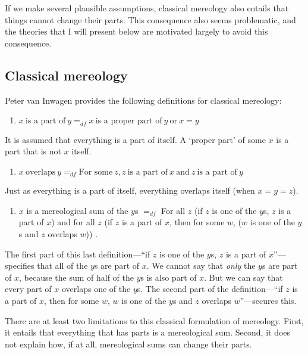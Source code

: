 \documentclass[11pt]{article}
\begin{document}
\begin{spacing}{1.5}
If we make several plausible assumptions, classical mereology also
entails that things cannot change their parts.  This consequence also
seems problematic, and the theories that I will present below are
motivated largely to avoid this consequence.

\subsection{Classical mereology}
\label{tech}
Peter van Inwagen provides the following definitions for classical
mereology:

\begin{enumerate}
  \item $x\ \text{is a part of}\ y =_{df} x\ \text{is a proper part
    of}\ y\ \text{or}\ x = y$
\end{enumerate}

It is assumed that everything is a part of itself.  A `proper part' of
some $x$ is a part that is not $x$ itself.

\begin{enumerate}[start=2]
  \item $x\ \text{overlaps}\ y =_{df} \text{For some}\ z, z\ \text{is
    a part of}\ x\ \text{and}\ z\ \text{is a part of}\ y$
\end{enumerate}

Just as everything is a part of itself, everything overlaps itself
(when $x = y = z$).

\begin{enumerate}[start=3]
  \item $x$ is a mereological sum of the $y$s $=_{df}$ For all $z$ (if
    $z$ is one of the $y$s, $z$ is a part of $x$) and for all $z$ (if
    $z$ is a part of $x$, then for some $w$, ($w$ is one of the $y$s
    and $z$ overlaps $w$)) \citeyearpar[618--619]{inwagen2006}.
\end{enumerate}

The first part of this last definition---``if $z$ is one of the $y$s,
$z$ is a part of $x$''---specifies that all of the $y$s are part of
$x$.  We cannot say that {\em only} the $y$s are part of $x$, because
the sum of half of the $y$s is also part of $x$.  But we can say that
every part of $x$ overlaps one of the $y$s.  The second part of the
definition---``if $z$ is a part of $x$, then for some $w$, $w$ is one
of the $y$s and $z$ overlaps $w$''---secures this.

There are at least two limitations to this classical formulation of
mereology.  First, it entails that everything that has parts is a
mereological sum.  Second, it does not explain how, if at all,
mereological sums can change their parts.


\end{spacing}
\end{document}
